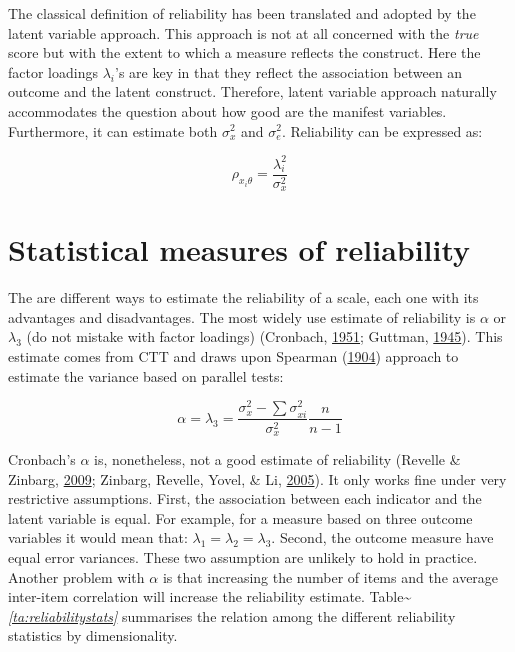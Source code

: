 \documentclass[]{book}
\begin{document}
The classical definition of reliability has been translated and adopted by the latent variable approach. This approach is not at all concerned with the \emph{true} score but with the extent to which a measure reflects the construct. Here the factor loadings \(\lambda_i\)'s are key in that they reflect the association between an outcome and the latent construct. Therefore, latent variable approach naturally accommodates the question about how good are the manifest variables. Furthermore, it can estimate both \(\sigma^{2}_{x}\) and \(\sigma^{2}_{e}\). Reliability can be expressed as:

\begin{equation}
\label{eq:reliability2}
\rho_{x_{i}\theta} = \frac{\lambda^2_{i}} {\sigma^{2}_{x}}
\end{equation}

\hypertarget{Chapter-3-measuresrel}{%
\section{Statistical measures of reliability}\label{Chapter-3-measuresrel}}

The are different ways to estimate the reliability of a scale, each one with its advantages and disadvantages. The most widely use estimate of reliability is \(\alpha\) or \(\lambda_3\) (do not mistake with factor loadings) (Cronbach, \protect\hyperlink{ref-Cronbach1951}{1951}; Guttman, \protect\hyperlink{ref-Guttman1945}{1945}). This estimate comes from CTT and draws upon Spearman (\protect\hyperlink{ref-Spearman1904}{1904}) approach to estimate the variance based on parallel tests:

\begin{equation}
\label{eq:alpha}
\alpha = \lambda_3 = \frac{\sigma^{2}_{x} - \sum\sigma^{2}_{xi}} {\sigma^{2}_{x}} \frac{n} {n-1}
\end{equation}

Cronbach's \(\alpha\) is, nonetheless, not a good estimate of reliability (Revelle \& Zinbarg, \protect\hyperlink{ref-Revelle2009}{2009}; Zinbarg, Revelle, Yovel, \& Li, \protect\hyperlink{ref-Zinbarg2005}{2005}). It only works fine under very restrictive assumptions. First, the association between each indicator and the latent variable is equal. For example, for a measure based on three outcome variables it would mean that: \(\lambda_1=\lambda_2=\lambda_3\). Second, the outcome measure have equal error variances. These two assumption are unlikely to hold in practice. Another problem with \(\alpha\) is that increasing the number of items and the average inter-item correlation will increase the reliability estimate. Table\textasciitilde{}\emph{\ref{ta:reliabilitystats}} summarises the relation among the different reliability statistics by dimensionality.
\end{document}
